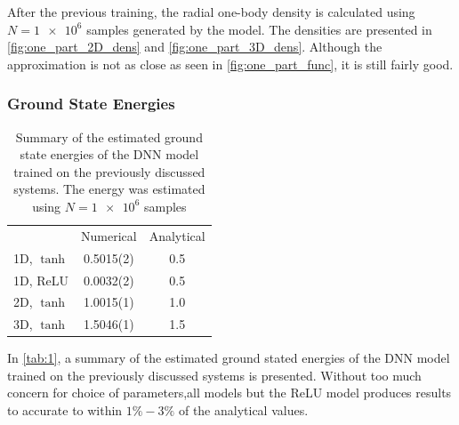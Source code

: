 After the previous training, the radial one-body density is calculated using
$N=\num{1e6}$ samples generated by the model. The densities are presented in
\autoref{fig:one_part_2D_dens} and \autoref{fig:one_part_3D_dens}. Although the
approximation is not as close as seen in \autoref{fig:one_part_func}, it is
still fairly good.  

\subsubsection{Ground State Energies}

\begin{table}[ht]
	\begin{tabular}{l|SS}
		\toprule
		           & {Numerical} & {Analytical} \\
		1D, \(\tanh\)   & 0.5015(2) &   0.5      \\
		1D, ReLU   & 0.0032(2) &   0.5      \\
		2D, \(\tanh\)   & 1.0015(1) &   1.0        \\
		3D, \(\tanh\)   & 1.5046(1) &   1.5      \\
		\bottomrule
	\end{tabular}
	\caption{Summary of the estimated ground state energies of the DNN model
      trained on the previously discussed systems. The energy was estimated
      using $N=\num{1e6}$ samples} 
	\label{tab:1}
\end{table}

In \autoref{tab:1}, a summary of the estimated ground stated energies of the DNN
model trained on the previously discussed systems is presented. Without too much
concern for choice of parameters,all models but the ReLU model produces results
to accurate to within $1\%-3\%$ of the analytical values. 


